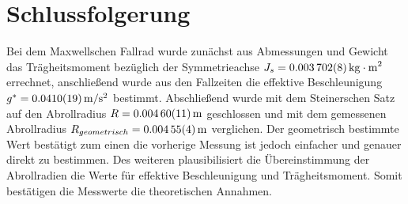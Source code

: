 \section{Schlussfolgerung}

Bei dem Maxwellschen Fallrad wurde zunächst aus Abmessungen und Gewicht das Trägheitsmoment bezüglich der Symmetrieachse $J_s=\SI{0.003702 \pm 0.000008}{kg\cdot m^2}$ errechnet, anschließend wurde aus den Fallzeiten die effektive Beschleunigung  $g^*=\SI{0.0410 \pm  0.0019}{m \per s \squared}$ bestimmt. Abschließend wurde mit dem Steinerschen Satz auf den Abrollradius $R=\SI{0.00460\pm 0.00011}{m}$ geschlossen und mit dem gemessenen Abrollradius $R_{geometrisch}=\SI{0.00455 \pm 0.00004}{m}$ verglichen. Der geometrisch bestimmte Wert bestätigt zum einen die vorherige Messung ist jedoch einfacher und genauer direkt zu bestimmen. Des weiteren plausibilisiert die Übereinstimmung der Abrollradien die Werte für effektive Beschleunigung und Trägheitsmoment. Somit bestätigen die Messwerte die theoretischen Annahmen.








